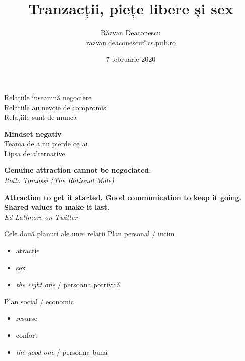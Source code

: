 \documentclass{simple}
\title[Tranzacții, piețe libere și sex]{Tranzacții, piețe libere și sex}
\institute{Unicorns, Fairies, Retards and Assholes Trip}
\author[Răzvan Deaconescu]{Răzvan Deaconescu \\
razvan.deaconescu@cs.pub.ro}
\date{7 februarie 2020}
\begin{document}
\frame{\titlepage}

\begin{frame}{}
  \centering
  \pause
  \vspace{0.5cm}
  \Large{Relațiile înseamnă negociere} \\
  \pause
  \vspace{0.5cm}
  \Large{Relațiile au nevoie de compromis} \\
  \pause
  \vspace{0.5cm}
  \Large{Relațiile sunt de muncă}
\end{frame}

\begin{frame}{}
  \centering
  \pause
  \vspace{0.5cm}
  \Large{\textbf{Mindset negativ}} \\
  \pause
  \vspace{0.5cm}
  \Large{Teama de a nu pierde ce ai} \\
  \pause
  \vspace{0.5cm}
  \Large{Lipsa de alternative}
\end{frame}

\begin{frame}{}
  \centering
  \vspace{0.5cm}
  \Large{\textbf{Genuine attraction cannot be negociated.}} \\
  \vspace{3mm}
  \hfill \textit{Rollo Tomassi (The Rational Male)}
\end{frame}

\begin{frame}{}
  \centering
  \vspace{0.5cm}
  \Large{\textbf{Attraction to get it started. Good communication to keep it going. Shared values to make it last.}} \\
  \vspace{3mm}
  \hfill \textit{Ed Latimore on Twitter}
\end{frame}

\begin{frame}{Cele două planuri ale unei relații}
  \pause
  \Large{Plan personal / intim}
    \begin{itemize}
      \pause
      \item atracție
      \pause
      \item sex
      \pause
      \item \textit{the right one} / persoana potrivită
    \end{itemize}
  \pause
  \Large{Plan social / economic}
    \begin{itemize}
      \pause
      \item resurse
      \pause
      \item confort
      \pause
      \item \textit{the good one} / persoana bună
    \end{itemize}
\end{frame}
\end{document}
